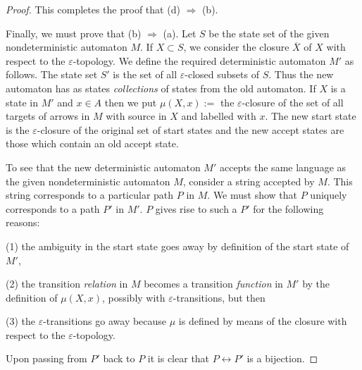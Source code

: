 \begin{proof}
    This completes the proof that (d) $\Rightarrow$ (b).

    Finally, we must prove that (b) $\Rightarrow$ (a). Let $S$ be the
    state set of the given nondeterministic automaton $M$. If $X
    \subset S$, we consider the closure $\overline{X}$ of $X$ with
    respect to the $\varepsilon$-topology.  We define the required
    deterministic automaton $M'$ as follows.  The state set $S'$ is
    the set of all $\varepsilon$-closed subsets of $S$. Thus the new
    automaton has as states \emph{collections} of states from the old
    automaton. If $X$ is a state in $M'$ and $x\in A$ then we put
    \(\mu(X,x) := \) the $\varepsilon$-closure of the set of all
    targets of arrows in $M$ with source in $X$ and labelled with $x$.
    The new start state is the $\varepsilon$-closure of the original
    set of start states and the new accept states are those which
    contain an old accept state.

    To see that the new deterministic automaton $M'$ accepts the same
    language as the given nondeterministic automaton $M$, consider a
    string accepted by $M$. This string corresponds to a particular
    path $P$ in $M$. We must show that $P$ uniquely corresponds to a
    path $P'$ in $M'$. $P$ gives rise to such a $P'$ for the following
    reasons:

    (1) the ambiguity in the start state goes away by definition of
    the start state of $M',$

    (2) the transition \emph{relation} in $M$ becomes a transition
    \emph{function} in $M'$ by the definition of $\mu(X,x)$, possibly
    with $\varepsilon$-transitions, but then

    (3) the $\varepsilon$-transitions go away because $\mu$ is defined
    by means of the closure with respect to the
    $\varepsilon$-topology.

    Upon passing from $P'$ back to $P$ it is clear that $P
    \leftrightarrow P'$ is a bijection.
\end{proof}

